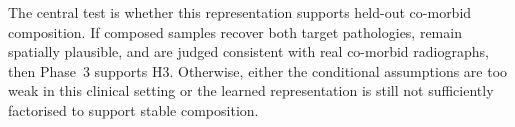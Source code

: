 The central test is whether this representation supports held-out co-morbid composition. If composed samples recover both target pathologies, remain spatially plausible, and are judged consistent with real co-morbid radiographs, then Phase~3 supports H3. Otherwise, either the conditional assumptions are too weak in this clinical setting or the learned representation is still not sufficiently factorised to support stable composition.
